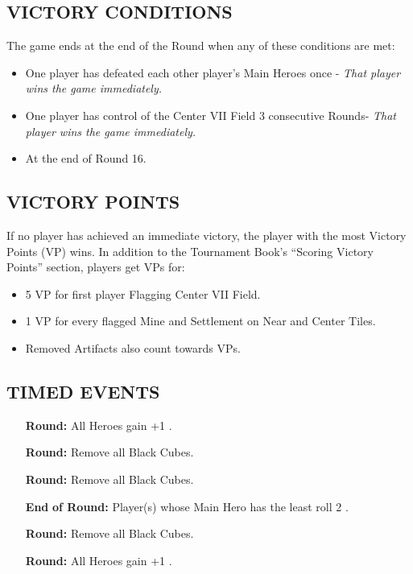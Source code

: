 \begin{multicols*}{2}
\subsection*{\MakeUppercase{Victory Conditions}}
The game ends at the end of the Round when any of these conditions are met:

\begin{itemize}
  \item One player has defeated each other player's Main Heroes once - \textit{That player wins the game immediately.}
  \item One player has control of the Center VII Field 3 consecutive Rounds- \textit{That player wins the game immediately.}
  \item At the end of Round 16.
\end{itemize}

\subsection*{\MakeUppercase{Victory Points}}
If no player has achieved an immediate victory, the player with the most Victory Points (VP) wins.
In addition to the Tournament Book's ``Scoring Victory Points'' section, players get VPs for:

\begin{itemize}
  \item 5 VP for first player Flagging Center VII Field.
  \item 1 VP for every flagged Mine and Settlement on Near and Center Tiles.
  \item Removed Artifacts also count towards VPs.
\end{itemize}

\subsection*{\MakeUppercase{Timed Events}}

\begin{itemize}
  \item[\textbf{\nth{1}}] \textbf{Round:} All Heroes gain +1 .
  \item[\textbf{\nth{4}}] \textbf{Round:} Remove all Black Cubes.
  \item[\textbf{\nth{9}}] \textbf{Round:} Remove all Black Cubes.
  \item[\textbf{End}] \textbf{of  Round:} Player(s) whose Main Hero has the least  roll 2 .
  \item[\textbf{\nth{12}}] \textbf{Round:} Remove all Black Cubes.
  \item[\textbf{\nth{13}}] \textbf{Round:} All Heroes gain +1 .
\end{itemize}


\end{multicols*}
